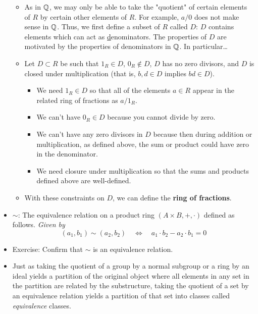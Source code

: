 \documentclass[../notes.tex]{subfiles}
\begin{document}
\begin{itemize}
    \begin{itemize}
        \item As in $\mathbb{Q}$, we may only be able to take the "quotient" of certain elements of $R$ by certain other elements of $R$. For example, $a/0$ does not make sense in $\mathbb{Q}$. Thus, we first define a subset of $R$ called $D$: $D$ contains elements which can act as \underline{d}enominators. The properties of $D$ are motivated by the properties of denominators in $\mathbb{Q}$. In particular\dots
        \item Let $D\subset R$ be such that $1_R\in D$, $0_R\notin D$, $D$ has no zero divisors, and $D$ is closed under multiplication (that is, $b,d\in D$ implies $bd\in D$).
        \begin{itemize}
            \item We need $1_R\in D$ so that all of the elements $a\in R$ appear in the related ring of fractions as $a/1_R$.
            \item We can't have $0_R\in D$ because you cannot divide by zero.
            \item We can't have any zero divisors in $D$ because then during addition or multiplication, as defined above, the sum or product could have zero in the denominator.
            \item We need closure under multiplication so that the sums and products defined above are well-defined.
        \end{itemize}
        \item With these constraints on $D$, we can define the \textbf{ring of fractions}.
    \end{itemize}
    \item $\bm{\sim}$: The equivalence relation on a product ring $(A\times B,+,\cdot)$ defined as follows. \emph{Given by}
    \begin{equation*}
        (a_1,b_1) \sim (a_2,b_2)
        \quad\Longleftrightarrow\quad
        a_1\cdot b_2-a_2\cdot b_1 = 0
    \end{equation*}
    \item Exercise: Confirm that $\sim$ is an equivalence relation.
    \item Just as taking the quotient of a group by a normal subgroup or a ring by an ideal yields a partition of the original object where all elements in any set in the partition are related by the substructure, taking the quotient of a set by an equivalence relation yields a partition of that set into classes called \emph{equivalence} classes.
    \begin{itemize}

\end{itemize}
\end{itemize}
\end{document}
